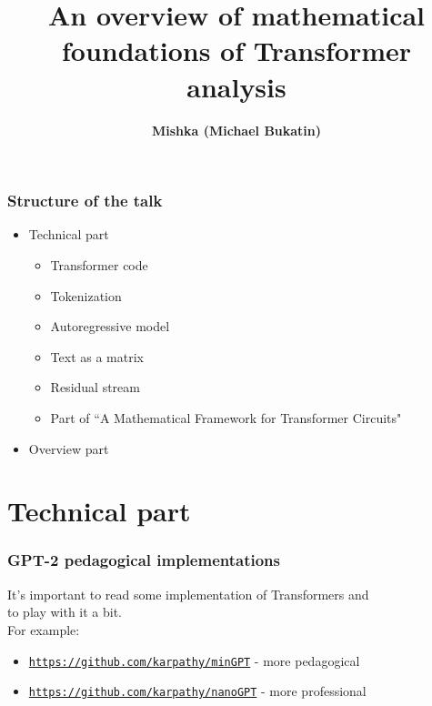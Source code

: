 \documentclass{beamer}
\newcommand{\msmagenta}[1]{{\color{mymagenta} #1}}
\begin{document}
\title{An overview of mathematical foundations of Transformer analysis}
\author{\msmagenta{\bf Mishka (Michael Bukatin)}}


\begin{frame}
  \titlepage
\end{frame}

\begin{frame}

\frametitle{Structure of the talk}

\begin{itemize}
\item Technical part
  \begin{itemize}
     \item Transformer code
     \item Tokenization
     \item Autoregressive model
     \item Text as a matrix
     \item Residual stream
     \item Part of ``A Mathematical Framework for Transformer Circuits"
  \end{itemize}
\item Overview part
\end{itemize}

\end{frame}

\section{Technical part}


\begin{frame}

  \frametitle{GPT-2 pedagogical implementations}

It's important to read some implementation of Transformers and\\ to play with it a bit.\\[2ex]

For example:

\begin{itemize}

\item\href{https://github.com/karpathy/minGPT}{\tt\small https://github.com/karpathy/minGPT} - more pedagogical

\item\href{https://github.com/karpathy/nanoGPT}{\tt\small https://github.com/karpathy/nanoGPT} - more professional

\end{itemize}

\end{frame}
\end{document}
